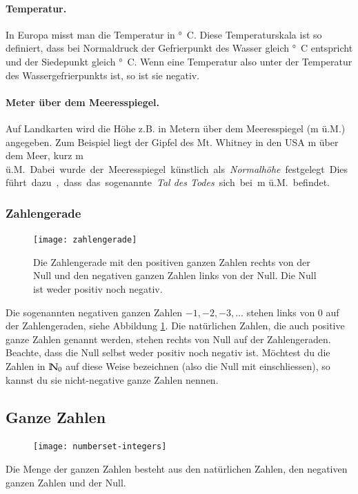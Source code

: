 \paragraph{Temperatur.}
In Europa misst man die Temperatur in \unit{°C}.
Diese Temperaturskala ist so definiert, dass bei Normaldruck der Gefrierpunkt des Wasser gleich \unit[0]{°C} entspricht und der Siedepunkt gleich \unit[100]{°C}.
Wenn eine Temperatur also unter der Temperatur des Wassergefrierpunkts ist, so ist sie negativ.

\paragraph{Meter über dem Meeresspiegel.}
Auf Landkarten wird die Höhe z.B. in Metern über dem Meeresspiegel (m ü.M.) angegeben.
Zum Beispiel liegt der Gipfel des Mt. Whitney in den USA \unit[4418]{m} über dem Meer, kurz \unit[4418]{m ü.M.}
Dabei wurde der Meeresspiegel künstlich als \emph{Normalhöhe} festgelegt.
Dies führt dazu, dass das sogenannte \emph{Tal des Todes} sich bei \unit[-86]{m ü.M.} befindet.

\subsubsection{Zahlengerade}
\begin{figure}[H]
	\texttt{[image: zahlengerade]}
	\caption{Die Zahlengerade mit den positiven ganzen Zahlen rechts von der Null und den negativen ganzen Zahlen links von der Null.
	Die Null ist weder positiv noch negativ.}
	\label{fig:zahlengerade-pos-neg}
\end{figure}

Die sogenannten negativen ganzen Zahlen $-1, -2, -3, \ldots$ stehen links von 0 auf der Zahlengeraden, siehe Abbildung \ref{fig:zahlengerade-pos-neg}.
Die natürlichen Zahlen, die auch positive ganze Zahlen genannt werden, stehen rechts von Null auf der Zahlengeraden. Beachte, dass die Null selbst weder positiv noch negativ ist.
Möchtest du die Zahlen in $\mathbb{N}_0$ auf diese Weise bezeichnen (also die Null mit einschliessen), so kannst du sie nicht-negative ganze Zahlen nennen.

\subsection{Ganze Zahlen}
\begin{figure}
	\vspace{-1cm}
	\texttt{[image: numberset-integers]}
	\vspace{-2cm}
\end{figure}
Die Menge der ganzen Zahlen besteht aus den natürlichen Zahlen, den negativen ganzen Zahlen und der Null.

